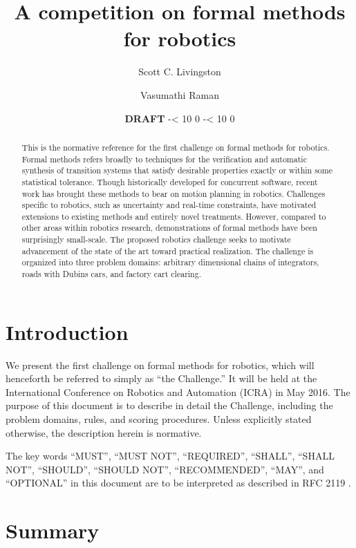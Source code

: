\documentclass{amsart}
\theoremstyle{definition}
\def\now{\number\year%
-{\ifnum \month < 10 0\fi}\number\month%
-{\ifnum \day < 10 0\fi}\number\day}
\begin{document}
\title{A competition on formal methods for robotics}
\author{Scott C. Livingston}
\author{Vasumathi Raman}
\date{\textbf{DRAFT} \now}
\begin{abstract}
This is the normative reference for the first challenge on formal methods for
robotics.  Formal methods refers broadly to techniques for the verification and
automatic synthesis of transition systems that satisfy desirable properties
exactly or within some statistical tolerance.  Though historically developed for
concurrent software, recent work has brought these methods to bear on motion
planning in robotics.  Challenges specific to robotics, such as uncertainty and
real-time constraints, have motivated extensions to existing methods and
entirely novel treatments.  However, compared to other areas within robotics
research, demonstrations of formal methods have been surprisingly small-scale.
The proposed robotics challenge seeks to motivate advancement of the state of
the art toward practical realization.  The challenge is organized into three
problem domains: arbitrary dimensional chains of integrators, roads with Dubins
cars, and factory cart clearing.
\end{abstract}
\maketitle
\tableofcontents

\section{Introduction}

We present the first challenge on formal methods for robotics, which will
henceforth be referred to simply as ``the Challenge.''  It will be held at the
International Conference on Robotics and Automation ({ICRA}) in May 2016. The purpose
of this document is to describe in detail the Challenge, including the problem
domains, rules, and scoring procedures.  Unless explicitly stated otherwise, the
description herein is normative.

The key words ``MUST'', ``MUST NOT'', ``REQUIRED'', ``SHALL'', ``SHALL NOT'',
``SHOULD'', ``SHOULD NOT'', ``RECOMMENDED'', ``MAY'', and ``OPTIONAL'' in this
document are to be interpreted as described in RFC 2119 \cite{ietfrfc2119}.

\section{Summary}
\end{document}
